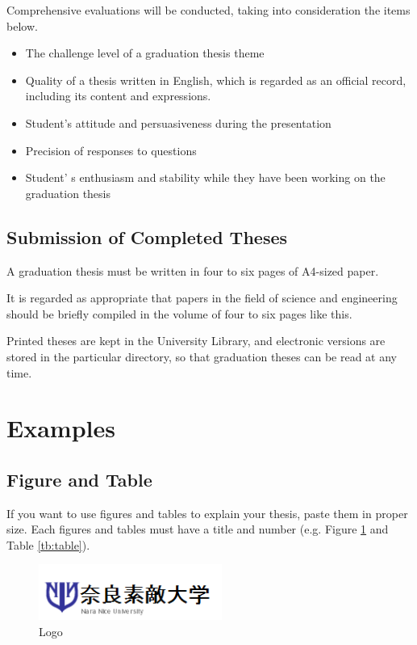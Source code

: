 \documentclass[ams]{U-AizuGT}
\begin{document}
			Comprehensive evaluations will be conducted, taking into consideration the items below.
			
			\begin{itemize}
				\setlength{\parskip}{0cm}
				\setlength{\itemsep}{0cm}
				\item The challenge level of a graduation thesis theme
				\item Quality of a thesis written in English, which is regarded as an official record, including its content and expressions. 
				\item Student's attitude and persuasiveness during the presentation
				\item Precision of responses to questions
				\item Student' s enthusiasm and stability while they have been working on the graduation thesis
			\end{itemize}
			
		\subsection{Submission of Completed Theses}
			A graduation thesis must be written in four to six pages of A4-sized paper. 
			
			It is regarded as appropriate that papers in the field of science and engineering should be briefly compiled in the volume of four to six pages like this.
			
			Printed theses are kept in the University Library, and electronic versions are stored in the particular directory, so that graduation theses can be read at any time.
			
	\section{Examples}
		\subsection{Figure and Table}
			If you want to use figures and tables to explain your thesis, paste them in proper size. Each figures and tables must have a title and number (e.g. Figure \ref{fig:logo} and Table \ref{tb:table}).
			
			\begin{figure}[htb]
				\centering
				\includegraphics[width=6cm]{img/Naranice.png}
				\caption{Logo}
				\label{fig:logo} %
			\end{figure}
			
\end{document}
